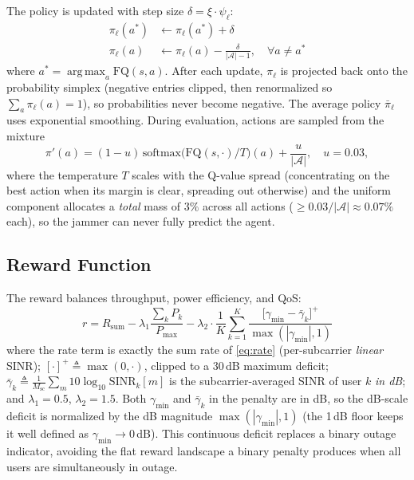 \documentclass[10pt,conference]{IEEEtran}
\DeclareMathOperator*{\argmax}{arg\,max}
\begin{document}
The policy is updated with step size $\delta = \xi \cdot \psi_\ell$:
\begin{align}
\pi_\ell(a^*) &\leftarrow \pi_\ell(a^*) + \delta \\
\pi_\ell(a) &\leftarrow \pi_\ell(a) - \frac{\delta}{|\mathcal{A}|-1}, \quad \forall a \neq a^*
\label{eq:policy_update}
\end{align}
where $a^* = \argmax_a \text{FQ}(s,a)$. After each update, $\pi_\ell$ is projected back onto the probability simplex (negative entries clipped, then renormalized so $\sum_a \pi_\ell(a) = 1$), so probabilities never become negative. The average policy $\bar{\pi}_\ell$ uses exponential smoothing. During evaluation, actions are sampled from the mixture
\begin{equation}
\pi'(a) = (1-u)\,\mathrm{softmax}\!\big(\text{FQ}(s,\cdot)/T\big)(a) + \frac{u}{|\mathcal{A}|}, \quad u = 0.03,
\label{eq:eval_policy}
\end{equation}
where the temperature $T$ scales with the Q-value spread (concentrating on the best action when its margin is clear, spreading out otherwise) and the uniform component allocates a \emph{total} mass of $3\%$ across all actions ($\geq 0.03/|\mathcal{A}| \approx 0.07\%$ each), so the jammer can never fully predict the agent.

\subsection{Reward Function}

The reward balances throughput, power efficiency, and QoS:
\begin{equation}
r = R_{\mathrm{sum}} - \lambda_1\frac{\sum_k P_k}{P_{\max}} - \lambda_2 \cdot \frac{1}{K}\sum_{k=1}^{K}\frac{\big[\gamma_{\min} - \bar{\gamma}_k\big]^{+}}{\max(|\gamma_{\min}|, 1)}
\label{eq:reward}
\end{equation}
where the rate term is exactly the sum rate of \eqref{eq:rate} (per-subcarrier \emph{linear} SINR); $[\cdot]^+ \triangleq \max(0,\cdot)$, clipped to a 30\,dB maximum deficit; $\bar{\gamma}_k \triangleq \frac{1}{M_{\mathrm{sc}}}\sum_{m} 10\log_{10}\mathrm{SINR}_k[m]$ is the subcarrier-averaged SINR of user $k$ \emph{in dB}; and $\lambda_1=0.5$, $\lambda_2=1.5$. Both $\gamma_{\min}$ and $\bar{\gamma}_k$ in the penalty are in dB, so the dB-scale deficit is normalized by the dB magnitude $\max(|\gamma_{\min}|,1)$ (the 1\,dB floor keeps it well defined as $\gamma_{\min}\!\to\!0$\,dB). This continuous deficit replaces a binary outage indicator, avoiding the flat reward landscape a binary penalty produces when all users are simultaneously in outage.
\end{document}
